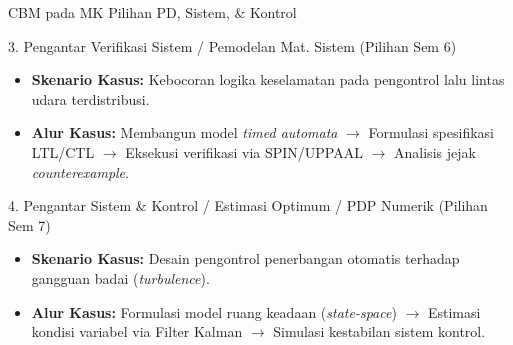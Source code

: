 \documentclass[aspectratio=169]{beamer} %
\begin{document}
\begin{frame}{CBM pada MK Pilihan PD, Sistem, \& Kontrol}
    \begin{block}{3. Pengantar Verifikasi Sistem / Pemodelan Mat. Sistem (Pilihan Sem 6)}
        \begin{itemize}
            \item \textbf{Skenario Kasus:} Kebocoran logika keselamatan pada pengontrol lalu lintas udara terdistribusi.
            \item \textbf{Alur Kasus:} Membangun model \textit{timed automata} $\rightarrow$ Formulasi spesifikasi LTL/CTL $\rightarrow$ Eksekusi verifikasi via SPIN/UPPAAL $\rightarrow$ Analisis jejak \textit{counterexample}.
        \end{itemize}
    \end{block}

    \begin{block}{4. Pengantar Sistem \& Kontrol / Estimasi Optimum / PDP Numerik (Pilihan Sem 7)}
        \begin{itemize}
            \item \textbf{Skenario Kasus:} Desain pengontrol penerbangan otomatis terhadap gangguan badai (\textit{turbulence}).
            \item \textbf{Alur Kasus:} Formulasi model ruang keadaan (\textit{state-space}) $\rightarrow$ Estimasi kondisi variabel via Filter Kalman $\rightarrow$ Simulasi kestabilan sistem kontrol.
        \end{itemize}
    \end{block}
\end{frame}
\end{document}
